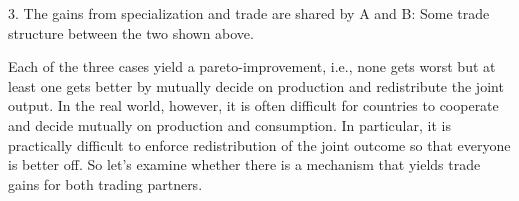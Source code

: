 {3. The gains from specialization and trade are shared by A and B: Some trade structure between the two shown above.

Each of the three cases yield a pareto-improvement, i.e., none gets worst but at least one gets better by mutually decide on production and redistribute the joint output. In the real world, however, it is often difficult for countries to cooperate and decide mutually on production and consumption. In particular, it is practically difficult to enforce redistribution of the joint outcome so that everyone is better off. 
So let's examine whether there is a mechanism that yields trade gains for both trading partners.

%



}
